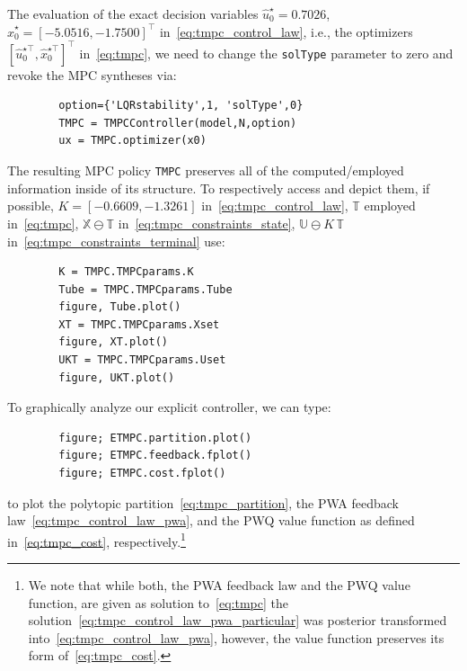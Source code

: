 \documentclass[letterpaper, 10 pt, conference]{ieeeconf}
\begin{document}
	
	
	The evaluation of the exact decision variables $\hat{u}_{0}^{\star} = 0.7026$, $\hat{x}_{0}^{\star} = [-5.0516, -1.7500]^{\top}$ in~\eqref{eq:tmpc_control_law}, i.e., the optimizers $\left[ \hat{u}_{0}^{\star\top}, \hat{x}_{0}^{\star\top} \right]^{\top}$ in~\eqref{eq:tmpc}, we need to change the \texttt{solType} parameter to zero and revoke the MPC syntheses via:
	\begin{verbatim}
		option={'LQRstability',1, 'solType',0}
		TMPC = TMPCController(model,N,option)
		ux = TMPC.optimizer(x0)
	\end{verbatim}
	The resulting MPC policy \texttt{TMPC} preserves all of the computed/employed information inside of its structure. To respectively access and depict them, if possible, $K = [-0.6609, -1.3261]$ in~\eqref{eq:tmpc_control_law}, $\mathbb{T}$ employed in~\eqref{eq:tmpc}, $\mathbb{X} \ominus \mathbb{T}$ in~\eqref{eq:tmpc_constraints_state}, $\mathbb{U} \ominus K \, \mathbb{T}$ in~\eqref{eq:tmpc_constraints_terminal} use:
	\begin{verbatim}
		K = TMPC.TMPCparams.K
		Tube = TMPC.TMPCparams.Tube
		figure, Tube.plot()
		XT = TMPC.TMPCparams.Xset
		figure, XT.plot()
		UKT = TMPC.TMPCparams.Uset
		figure, UKT.plot()
	\end{verbatim}
	
	To graphically analyze our explicit controller, we can type:
	\begin{verbatim}
		figure; ETMPC.partition.plot()
		figure; ETMPC.feedback.fplot()
		figure; ETMPC.cost.fplot()
	\end{verbatim}
	to plot the polytopic partition~\eqref{eq:tmpc_partition}, the PWA feedback law~\eqref{eq:tmpc_control_law_pwa}, and the PWQ value function as defined in~\eqref{eq:tmpc_cost}, respectively.\footnote{We note that while both, the PWA feedback law and the PWQ value function, are given as solution to~\eqref{eq:tmpc} the solution~\eqref{eq:tmpc_control_law_pwa_particular} was posterior transformed into~\eqref{eq:tmpc_control_law_pwa}, however, the value function preserves its form of~\eqref{eq:tmpc_cost}.}
	
\end{document}
